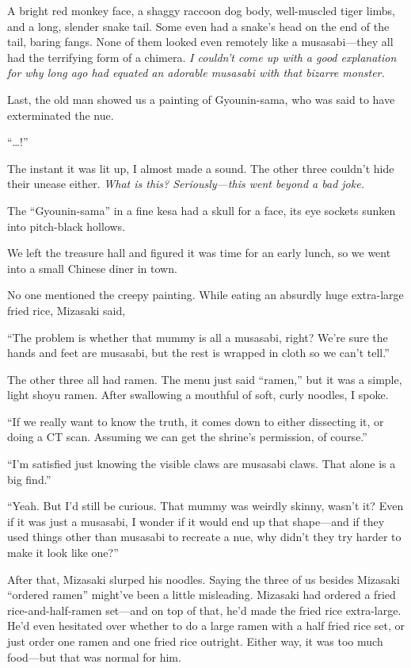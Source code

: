\documentclass[
    a4paper,
    12pt,
    twoside,
    openany,
    UTF8,
    fontset=windows
]{ctexbook}
\begin{document}
A bright red monkey face, a shaggy raccoon dog body, well-muscled tiger limbs, and a long, slender snake tail. Some even had a snake's head on the end of the tail, baring fangs. None of them looked even remotely like a musasabi---they all had the terrifying form of a chimera. \textit{I couldn't come up with a good explanation for why long ago had equated an adorable musasabi with that bizarre monster.}

Last, the old man showed us a painting of Gyounin-sama, who was said to have exterminated the nue.

``\dots!''

The instant it was lit up, I almost made a sound. The other three couldn't hide their unease either. \textit{What is this? Seriously---this went beyond a bad joke.}

The ``Gyounin-sama'' in a fine kesa had a skull for a face, its eye sockets sunken into pitch-black hollows.

We left the treasure hall and figured it was time for an early lunch, so we went into a small Chinese diner in town.

No one mentioned the creepy painting. While eating an absurdly huge extra-large fried rice, Mizasaki said,

``The problem is whether that mummy is all a musasabi, right? We're sure the hands and feet are musasabi, but the rest is wrapped in cloth so we can't tell.''

The other three all had ramen. The menu just said ``ramen,'' but it was a simple, light shoyu ramen. After swallowing a mouthful of soft, curly noodles, I spoke.

``If we really want to know the truth, it comes down to either dissecting it, or doing a CT scan. Assuming we can get the shrine's permission, of course.''

``I'm satisfied just knowing the visible claws are musasabi claws. That alone is a big find.''

``Yeah. But I'd still be curious. That mummy was weirdly skinny, wasn't it? Even if it was just a musasabi, I wonder if it would end up that shape---and if they used things other than musasabi to recreate a nue, why didn't they try harder to make it look like one?''


After that, Mizasaki slurped his noodles. Saying the three of us besides Mizasaki ``ordered ramen'' might've been a little misleading. Mizasaki had ordered a fried rice-and-half-ramen set---and on top of that, he'd made the fried rice extra-large. He'd even hesitated over whether to do a large ramen with a half fried rice set, or just order one ramen and one fried rice outright. Either way, it was too much food---but that was normal for him.
\end{document}
